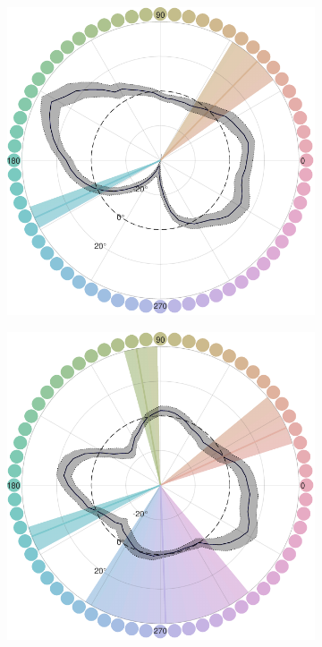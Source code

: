 \begin{figure}
    \centering
    \begin{subfigure}[b]{0.49\textwidth}
         \centering
         \caption{}
         \includegraphics[width=\textwidth]{../../../Analyses/211012_124119_Pollux/210422--211012_Pollux_categorybias2_230225.pdf}
         \label{fig:BiasCurvesPollux}
    \end{subfigure}
    \hfill
    \begin{subfigure}[b]{0.49\textwidth}
         \centering
         \caption{}
         \includegraphics[width=\textwidth]{../../../Analyses/211108_090705_Castor/210517--211108_Castor_categorybias2_230225.pdf}    
         \label{fig:BiasCurvesCastor}
    \end{subfigure}
    

\end{figure}
